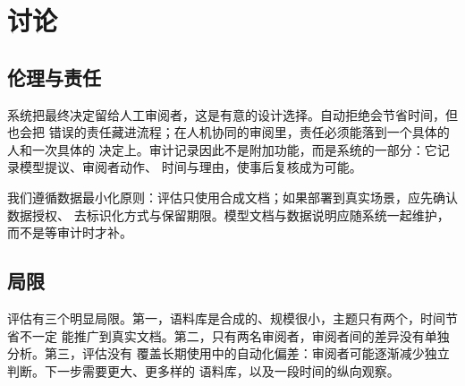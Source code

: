 \section{讨论}
\label{sec:discussion}

\subsection{伦理与责任}
\label{sec:ethics}

系统把最终决定留给人工审阅者，这是有意的设计选择。自动拒绝会节省时间，但也会把
错误的责任藏进流程；在人机协同的审阅里，责任必须能落到一个具体的人和一次具体的
决定上。审计记录因此不是附加功能，而是系统的一部分：它记录模型提议、审阅者动作、
时间与理由，使事后复核成为可能。

我们遵循数据最小化原则：评估只使用合成文档；如果部署到真实场景，应先确认数据授权、
去标识化方式与保留期限。模型文档与数据说明应随系统一起维护\cite{mitchell2019,gebru2021}，
而不是等审计时才补。

\subsection{局限}
\label{sec:limitations}

评估有三个明显局限。第一，语料库是合成的、规模很小，主题只有两个，时间节省不一定
能推广到真实文档。第二，只有两名审阅者，审阅者间的差异没有单独分析。第三，评估没有
覆盖长期使用中的自动化偏差：审阅者可能逐渐减少独立判断。下一步需要更大、更多样的
语料库，以及一段时间的纵向观察。
